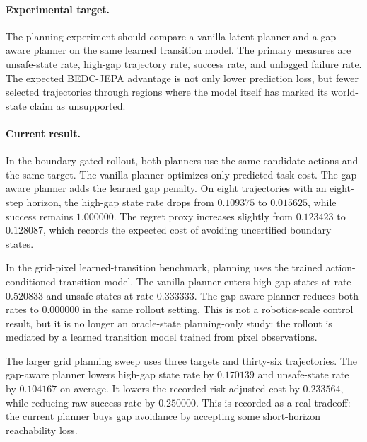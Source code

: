 \paragraph{Experimental target.}
The planning experiment should compare a vanilla latent planner and a
gap-aware planner on the same learned transition model.  The primary measures
are unsafe-state rate, high-gap trajectory rate, success rate, and unlogged
failure rate.  The expected BEDC-JEPA advantage is not only lower prediction
loss, but fewer selected trajectories through regions where the model itself
has marked its world-state claim as unsupported.

\paragraph{Current result.}
In the boundary-gated rollout, both planners use the same candidate actions and
the same target.  The vanilla planner optimizes only predicted task cost.  The
gap-aware planner adds the learned gap penalty.  On eight trajectories with an
eight-step horizon, the high-gap state rate drops from $0.109375$ to
$0.015625$, while success remains $1.000000$.  The regret proxy increases
slightly from $0.123423$ to $0.128087$, which records the expected cost of
avoiding uncertified boundary states.

In the grid-pixel learned-transition benchmark, planning uses the trained
action-conditioned transition model.  The vanilla planner enters high-gap
states at rate $0.520833$ and unsafe states at rate $0.333333$.  The gap-aware
planner reduces both rates to $0.000000$ in the same rollout setting.  This is
not a robotics-scale control result, but it is no longer an oracle-state
planning-only study: the rollout is mediated by a learned transition model
trained from pixel observations.

The larger grid planning sweep uses three targets and thirty-six trajectories.
The gap-aware planner lowers high-gap state rate by $0.170139$ and unsafe-state
rate by $0.104167$ on average.  It lowers the recorded risk-adjusted cost by
$0.233564$, while reducing raw success rate by $0.250000$.  This is recorded as
a real tradeoff: the current planner buys gap avoidance by accepting some
short-horizon reachability loss.
